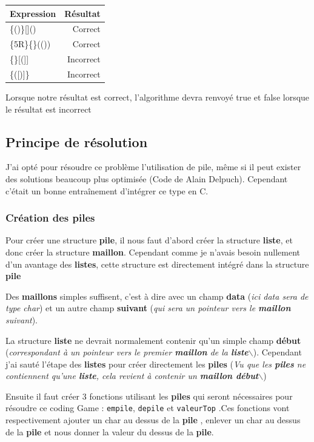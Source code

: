 \documentclass[11pt]{article}
\begin{document}
\begin{center}
\begin{tabular}{lr}
Expression & Résultat\\
\hline
\hline
\{()\}[]() & Correct\\
\{5R\}\{\}(()) & Correct\\
\{\}[(]] & Incorrect\\
\{([)]\} & Incorrect\\
\end{tabular}
\end{center}


Lorsque notre résultat est correct, l'algorithme devra renvoyé true et
false lorsque le résultat est incorrect

\subsection{Principe de résolution}
\label{sec:org0fc735f}

J'ai opté pour résoudre ce problème l'utilisation de pile, même si il peut exister des solutions beaucoup plus optimisée (Code de Alain Delpuch). Cependant c'était un bonne entraînement d'intégrer ce type en C.

\subsubsection{Création des piles}
\label{sec:org706f944}

Pour créer une structure \textbf{pile}, il nous faut d'abord créer la structure \textbf{liste}, et donc créer la structure \textbf{maillon}. Cependant comme je n'avais besoin nullement d'un avantage des \textbf{listes}, cette structure est directement intégré dans la structure \textbf{pile}  

Des \textbf{maillons} simples suffisent, c'est à dire avec un champ \textbf{data} (\emph{ici data sera de type char}) et un autre champ \textbf{suivant} (\emph{qui sera un pointeur vers le \textbf{maillon} suivant}).


La structure \textbf{liste} ne devrait normalement contenir qu'un simple champ \textbf{début} (\emph{correspondant à un pointeur vers le premier \textbf{maillon} de la \textbf{liste}$\backslash$}). Cependant j'ai sauté l'étape des \textbf{listes} pour créer directement les \textbf{piles} (\emph{Vu que les \textbf{piles} ne contiennent qu'une \textbf{liste}, cela revient à contenir un \textbf{maillon début}$\backslash$})

Ensuite il faut créer 3 fonctions utilisant les \textbf{piles} qui seront nécessaires pour résoudre ce coding Game : \texttt{empile}, \texttt{depile} et \texttt{valeurTop} .Ces fonctions vont respectivement ajouter un char au dessus de la \textbf{pile} , enlever un char au dessus de la \textbf{pile} et nous donner la valeur du dessus de la \textbf{pile}.
\end{document}
